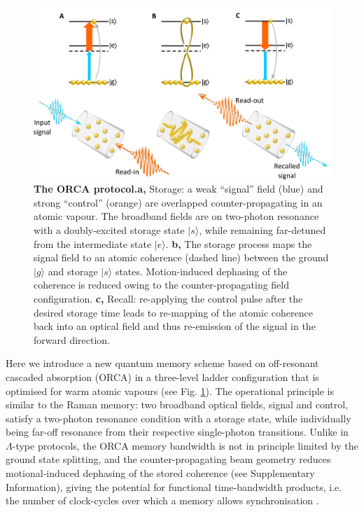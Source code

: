 \documentclass[12pt]{iopart}
\begin{document}
\begin{figure}[h!]
\includegraphics[width=\textwidth, right]{ORCApaperfig1.png} %
\caption{\textbf{The ORCA protocol.}\newline  \textbf{a,} Storage: a weak ``signal'' field (blue) and strong ``control'' (orange) are overlapped counter-propagating in an atomic vapour. The broadband fields are on two-photon resonance with a doubly-excited storage state $|s\rangle$, while remaining far-detuned from the intermediate state $|e\rangle$.
\textbf{b,} The storage process maps the signal field to an atomic coherence (dashed line) between the ground $|g\rangle$ and storage $|s\rangle$ states. Motion-induced dephasing of the coherence is reduced owing to the counter-propagating field configuration.
\textbf{c,} Recall: re-applying the control pulse after the desired storage time leads to re-mapping of the atomic coherence back into an optical field and thus re-emission of the signal in the forward direction.
}\label{fig:figFig1}
\end{figure}

Here we introduce a new quantum memory scheme based on off-resonant cascaded absorption (ORCA) in a three-level ladder configuration that is optimised for warm atomic vapours (see Fig. \ref{fig:figFig1}). The operational principle is similar to the Raman memory: two broadband optical fields, signal and control, satisfy a two-photon resonance condition with a storage state, while individually being far-off resonance from their respective single-photon transitions. Unlike in $\Lambda$-type protocols, the ORCA memory bandwidth is not in principle limited by the ground state splitting, and the counter-propagating beam geometry reduces motional-induced dephasing of the stored coherence (see Supplementary Information), giving the potential for functional time-bandwidth products, i.e. the number of clock-cycles over which a memory allows synchronisation \cite{Finkelstein2017}.
\end{document}
